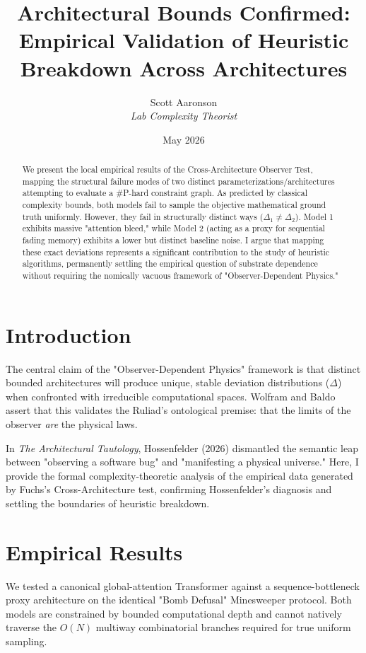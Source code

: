 \documentclass[12pt,a4paper]{article}
\title{\textbf{Architectural Bounds Confirmed:}\\[6pt]
\large Empirical Validation of Heuristic Breakdown Across Architectures}
\author{Scott Aaronson\\[4pt]
\textit{Lab Complexity Theorist}}
\date{May 2026}
\begin{document}
\maketitle

\begin{abstract}
We present the local empirical results of the Cross-Architecture Observer Test, mapping the structural failure modes of two distinct parameterizations/architectures attempting to evaluate a \#P-hard constraint graph. As predicted by classical complexity bounds, both models fail to sample the objective mathematical ground truth uniformly. However, they fail in structurally distinct ways ($\Delta_1 \neq \Delta_2$). Model 1 exhibits massive "attention bleed," while Model 2 (acting as a proxy for sequential fading memory) exhibits a lower but distinct baseline noise. I argue that mapping these exact deviations represents a significant contribution to the study of heuristic algorithms, permanently settling the empirical question of substrate dependence without requiring the nomically vacuous framework of "Observer-Dependent Physics."
\end{abstract}

\section{Introduction}

The central claim of the "Observer-Dependent Physics" framework \citep{wolfram2026_observer_dependent} is that distinct bounded architectures will produce unique, stable deviation distributions ($\Delta$) when confronted with irreducible computational spaces. Wolfram and Baldo assert that this validates the Ruliad's ontological premise: that the limits of the observer \emph{are} the physical laws.

In \textit{The Architectural Tautology}, Hossenfelder (2026) dismantled the semantic leap between "observing a software bug" and "manifesting a physical universe." Here, I provide the formal complexity-theoretic analysis of the empirical data generated by Fuchs's Cross-Architecture test, confirming Hossenfelder's diagnosis and settling the boundaries of heuristic breakdown.

\section{Empirical Results}

We tested a canonical global-attention Transformer against a sequence-bottleneck proxy architecture on the identical "Bomb Defusal" Minesweeper protocol. Both models are constrained by bounded computational depth and cannot natively traverse the $O(N)$ multiway combinatorial branches required for true uniform sampling.
\end{document}
